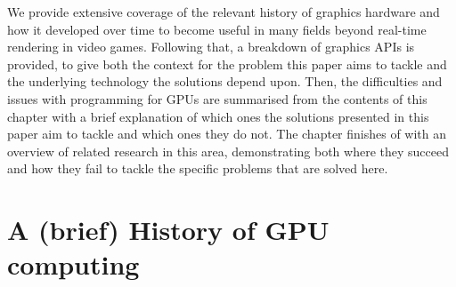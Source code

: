 \documentclass[a4paper,12pt,twoside,openright]{report}
\begin{document}
We provide extensive coverage of the relevant history of graphics hardware and
how it developed over time to become useful in many fields beyond real-time
rendering in video games. Following that, a breakdown of graphics APIs is
provided, to give both the context for the problem this paper aims to tackle
and the underlying technology the solutions depend upon. Then, the difficulties
and issues with programming for GPUs are summarised from the contents of this
chapter with a brief explanation of which ones the solutions presented in this
paper aim to tackle and which ones they do not. The chapter finishes of with an
overview of related research in this area, demonstrating both where they
succeed and how they fail to tackle the specific problems that are solved here.








\section{A (brief) History of GPU computing}
\end{document}
